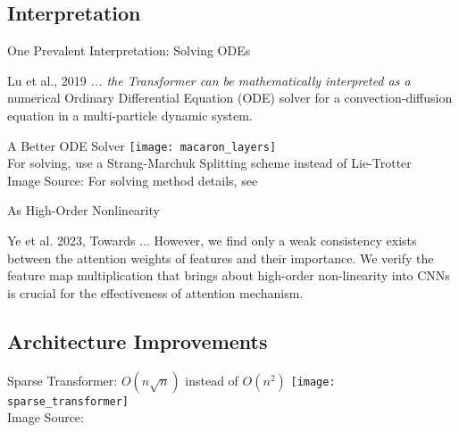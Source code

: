 \subsection{Interpretation}
\begin{frame}[c]{One Prevalent Interpretation: Solving ODEs}
    \large
    \begin{aquote}{Lu et al., 2019 \cite{lu_understanding_2019}}
        {\em ... the Transformer can be mathematically interpreted as
        a} numerical Ordinary Differential Equation (ODE) solver for a
        convection-diffusion equation in a multi-particle dynamic
        system.
    \end{aquote}
\end{frame}


\begin{frame}[c]{A Better ODE Solver}
    \texttt{[image: macaron\_layers]} \\
    \large
    For solving, use a Strang-Marchuk Splitting scheme instead of Lie-Trotter \\
    \normalsize
    Image Source: \cite{lu_understanding_2019}
    For solving method details, see \cite{geiser_decomposition_2009}
\end{frame}


\begin{frame}[c]{As High-Order Nonlinearity}
    \large
    \begin{aquote}{Ye et al. 2023, Towards ... \cite{ye_understanding_2023}}
        However, we find only a weak consistency exists between the attention
        weights of features and their importance. We verify the feature map
        multiplication that brings about high-order non-linearity into CNNs is
        crucial for the effectiveness of attention mechanism.
    \end{aquote}
\end{frame}

\subsection{Architecture Improvements}
\begin{frame}[c]{Sparse Transformer: $O(n \sqrt{n})$ instead of $O(n^2)$}
    \texttt{[image: sparse\_transformer]} \\
    \normalsize
    Image Source: \cite{child_generating_2019}
\end{frame}


